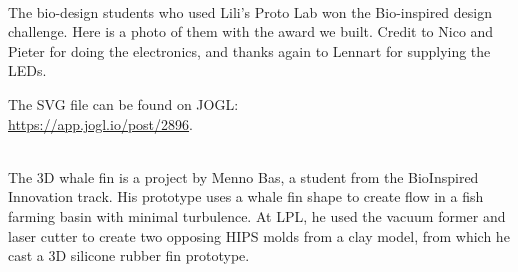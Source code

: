 \documentclass{report}
\begin{document}
 \\

The bio-design students who used Lili's Proto Lab won the Bio-inspired design challenge. Here is a photo of them with the award we built. Credit to Nico and Pieter for doing the electronics, and thanks again to Lennart for supplying the LEDs.

The SVG file can be found on JOGL:\\
\url{https://app.jogl.io/post/2896}.

\clearpage
\begin{figure}
    \centering
\end{figure}
\clearpage

 \\

The 3D whale fin is a project by Menno Bas, a student from the
BioInspired Innovation track. His prototype uses a whale fin shape to
create flow in a fish farming basin with minimal turbulence. At LPL, he
used the vacuum former and laser cutter to create two opposing HIPS
molds from a clay model, from which he cast a 3D silicone rubber fin
prototype.

\clearpage
\begin{figure}
    \centering
\end{figure}
\clearpage
\end{document}
